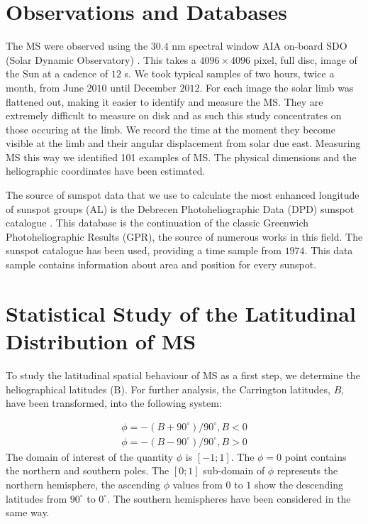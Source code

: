 \section{Observations and Databases}
The MS were observed using the $30.4$ nm spectral window AIA on-board SDO (Solar Dynamic Observatory) \cite{AIAspec}. This takes a $4096 \times 4096$ pixel, full disc, image of the Sun at a cadence of $12$ s. We took typical samples of two hours, twice a month, from June $2010$ until December $2012$. For each image the solar limb was flattened out, making it easier to identify and measure the MS. They are extremely difficult to measure on disk and as such this study concentrates on those occuring at the limb. We record the time at the moment they become visible at the limb and their angular displacement from solar due east. Measuring MS this way we identified 101 examples of MS. The physical dimensions and the heliographic coordinates have been estimated. 

The source of sunspot data that we use to calculate the most enhanced longitude of sunspot groups (AL) is the Debrecen Photoheliographic Data (DPD) sunspot catalogue \cite{Gyori2011}. This database is the continuation of the classic Greenwich Photoheliographic Results (GPR), the source of numerous works in this field. The sunspot catalogue has been used, providing a time sample from $1974$. This data sample contains information about area and position for every sunspot.

\section{Statistical Study of the Latitudinal Distribution of MS}
To study the latitudinal spatial behaviour of MS as a first step, we determine the heliographical latitudes (B). For further analysis, the Carrington latitudes, $B$, have been transformed, into the following system:

\begin{equation}
\begin{split}
\phi=-(B+90^{\circ})/90^{\circ},  B<0 \\
\phi=-(B-90^{\circ})/90^{\circ},  B>0
\end{split}
\end{equation}
\newpage
The domain of interest of the quantity $\phi$ is $[-1;1]$. The $\phi=0$ point contains the northern and southern poles. The $[0;1]$ sub-domain of $\phi$ represents the northern hemisphere, the ascending $\phi$ values from $0$ to $1$ show the descending latitudes from $90^{\circ}$ to $0^{\circ}$. The southern hemispheres have been considered in the same way.

